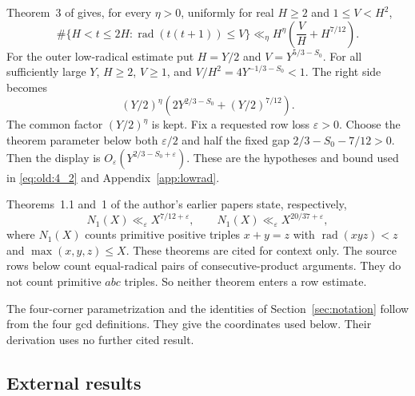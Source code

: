 Theorem~3 of \cite{Paper1} gives, for every \(\eta>0\), uniformly for real
\(H\ge2\) and \(1\le V<H^2\),
\[
 \#\{H<t\le2H:\operatorname{rad}(t(t+1))\le V\}
 \ll_\eta H^\eta\left(\frac VH+H^{7/12}\right).
\]
For the outer low-radical estimate put \(H=Y/2\) and
\(V=Y^{5/3-S_0}\). For all sufficiently large \(Y\), \(H\ge2\),
\(V\ge1\), and
\(V/H^2=4Y^{-1/3-S_0}<1\). The right side becomes
\[
 (Y/2)^\eta\left(2Y^{2/3-S_0}+(Y/2)^{7/12}\right).
\]
The common factor \((Y/2)^\eta\) is kept. Fix a requested row
loss \(\varepsilon>0\). Choose the theorem parameter below both
\(\varepsilon/2\) and half the fixed gap \(2/3-S_0-7/12>0\). Then the
display is \(O_\varepsilon(Y^{2/3-S_0+\varepsilon})\). These are
the hypotheses and bound used in \eqref{eq:old:4_2} and
Appendix~\ref{app:lowrad}.

Theorems~1.1 and~1 of the author's earlier papers
\cite{Zhang712,ZhangE20} state, respectively,
\[
 N_1(X)\ll_\varepsilon X^{7/12+\varepsilon},\qquad
 N_1(X)\ll_\varepsilon X^{20/37+\varepsilon},
\]
where \(N_1(X)\) counts primitive positive triples \(x+y=z\) with
\(\operatorname{rad}(xyz)<z\) and \(\max(x,y,z)\le X\). These theorems
are cited for context only. The source rows below count equal-radical
pairs of consecutive-product arguments. They do not count primitive
\(abc\) triples. So neither theorem enters a row estimate.

The four-corner parametrization and the identities of
Section~\ref{sec:notation} follow
from the four gcd definitions. They give the coordinates used below. Their
derivation uses no further cited result.

\subsection*{External results}

